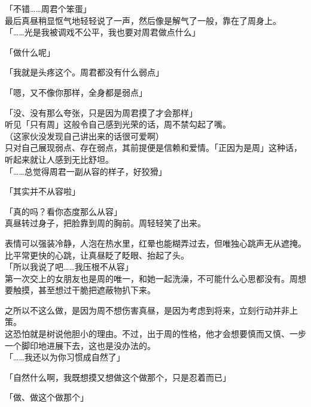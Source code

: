 「不错……周君个笨蛋」\\

最后真昼稍显怄气地轻轻说了一声，然后像是解气了一般，靠在了周身上。\\

「……光是我被调戏不公平，我也要对周君做点什么」

「做什么呢」

「我就是头疼这个。周君都没有什么弱点」

「嗯，又不像你那样，全身都是弱点」

「没、没有那么夸张，只是因为周君摸了才会那样」\\

听见「只有周」这般令自己感到光荣的话，周不禁勾起了嘴。\\

（这家伙没发现自己讲出来的话很可爱啊）\\

只对自己展现弱点、存在弱点，其前提便是信赖和爱情。「正因为是周」这种话，听起来就让人感到无比舒坦。\\

「……总觉得周君一副从容的样子，好狡猾」

「其实并不从容啦」

「真的吗？看你态度那么从容」\\

真昼转过身子，把脸靠到周的胸前。周轻轻笑了出来。

表情可以强装冷静，人泡在热水里，红晕也能糊弄过去，但唯独心跳声无从遮掩。\\

比平常更快的心跳，让真昼眨了眨眼、抬起了头。\\

「所以我说了吧……我压根不从容」\\

第一次交上的女朋友也是周的唯一，和她一起洗澡，不可能什么心思都没有。周想要触摸，甚至想过干脆把遮蔽物扒下来。

之所以不这么做，是因为周不想伤害真昼，是因为考虑到将来，立刻行动并非上策。\\

这恐怕就是树说他胆小的理由。不过，出于周的性格，他才会想要慎而又慎、一步一个脚印地进展下去，这也是没办法的。\\

「……我还以为你习惯成自然了」

「自然什么啊，我既想摸又想做这个做那个，只是忍着而已」

「做、做这个做那个」\\

